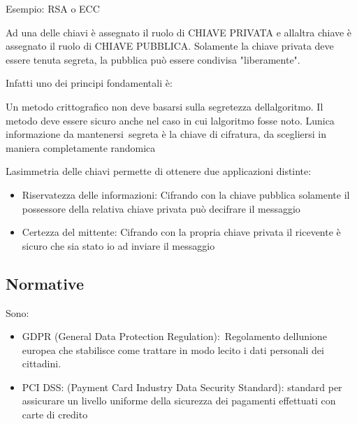 \documentclass[
]{article}
\providecommand{\tightlist}{%
  \setlength{\itemsep}{0pt}\setlength{\parskip}{0pt}}
\begin{document}
{Esempio: RSA o ECC}

{}

{Ad una delle chiavi è assegnato il ruolo di }{CHIAVE PRIVATA }{e
all\textquotesingle altra chiave è assegnato il ruolo di }{CHIAVE
PUBBLICA}{. Solamente la chiave privata deve essere tenuta segreta, la
pubblica può essere condivisa "liberamente". }

{Infatti uno dei principi fondamentali è:}

{Un metodo crittografico non deve basarsi sulla segretezza
dell\textquotesingle algoritmo. Il metodo deve essere sicuro anche nel
caso in cui l\textquotesingle algoritmo fosse noto.
L\textquotesingle unica informazione da }{mantenersi}{~segreta è la
chiave di cifratura, da scegliersi in maniera completamente randomica}

{}

{L\textquotesingle asimmetria delle chiavi permette di ottenere due
applicazioni distinte:}

\begin{itemize}
\tightlist
\item
  {Riservatezza delle informazioni: Cifrando con la chiave pubblica
  solamente il possessore della relativa chiave privata può decifrare il
  messaggio }
\item
  {Certezza del mittente: Cifrando con la propria chiave privata il
  ricevente è sicuro che sia stato io ad inviare il messaggio}
\end{itemize}

{}

\subsection{\texorpdfstring{{Normative}}{Normative}}\label{h.4j1ouz7e9ix1}

{Sono:}

\begin{itemize}
\tightlist
\item
  {GDPR (General Data Protection Regulation):}{~Regolamento
  dell\textquotesingle unione europea che stabilisce come trattare in
  modo lecito i dati personali dei cittadini. }
\end{itemize}

{}

\begin{itemize}
\tightlist
\item
  {PCI DSS: (Payment Card Industry Data Security Standard)}{: standard
  per assicurare un livello uniforme della sicurezza dei pagamenti
  effettuati con carte di credito}
\end{itemize}
\end{document}
